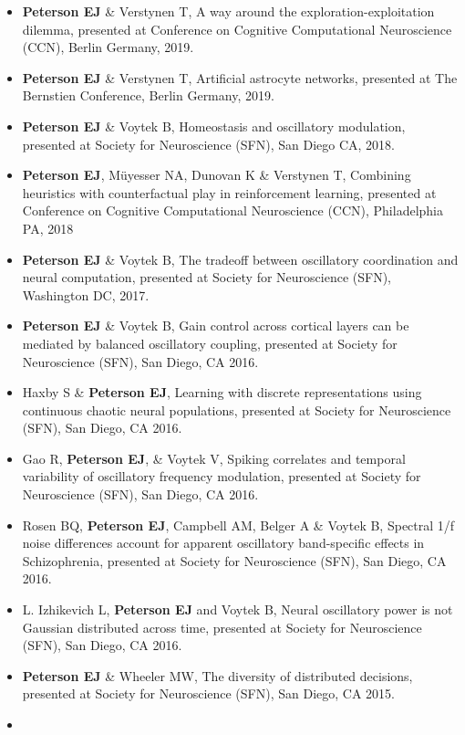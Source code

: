 \begin{itemize}
\item
  \textbf{Peterson EJ} \& Verstynen T, A way around the
  exploration-exploitation dilemma, presented at Conference on Cognitive
  Computational Neuroscience (CCN), Berlin Germany, 2019.
\item
  \textbf{Peterson EJ} \& Verstynen T, Artificial astrocyte networks,
  presented at The Bernstien Conference, Berlin Germany, 2019.
\item
  \textbf{Peterson EJ} \& Voytek B, Homeostasis and oscillatory
  modulation, presented at Society for Neuroscience (SFN), San Diego CA,
  2018.
\item
  \textbf{Peterson EJ}, Müyesser NA, Dunovan K \& Verstynen T, Combining
  heuristics with counterfactual play in reinforcement learning,
  presented at Conference on Cognitive Computational Neuroscience (CCN),
  Philadelphia PA, 2018
\item
  \textbf{Peterson EJ} \& Voytek B, The tradeoff between oscillatory
  coordination and neural computation, presented at Society for
  Neuroscience (SFN), Washington DC, 2017.
\item
  \textbf{Peterson EJ} \& Voytek B, Gain control across cortical layers
  can be mediated by balanced oscillatory coupling, presented at Society
  for Neuroscience (SFN), San Diego, CA 2016.
\item
  Haxby S \& \textbf{Peterson EJ}, Learning with discrete
  representations using continuous chaotic neural populations, presented
  at Society for Neuroscience (SFN), San Diego, CA 2016.
\item
  Gao R, \textbf{Peterson EJ}, \& Voytek V, Spiking correlates and
  temporal variability of oscillatory frequency modulation, presented at
  Society for Neuroscience (SFN), San Diego, CA 2016.
\item
  Rosen BQ, \textbf{Peterson EJ}, Campbell AM, Belger A \& Voytek B,
  Spectral 1/f noise differences account for apparent oscillatory
  band-specific effects in Schizophrenia, presented at Society for
  Neuroscience (SFN), San Diego, CA 2016.
\item
  L. Izhikevich L, \textbf{Peterson EJ} and Voytek B, Neural oscillatory
  power is not Gaussian distributed across time, presented at Society
  for Neuroscience (SFN), San Diego, CA 2016.
\item
  \textbf{Peterson EJ} \& Wheeler MW, The diversity of distributed
  decisions, presented at Society for Neuroscience (SFN), San Diego, CA
  2015.
\item

\end{itemize}
